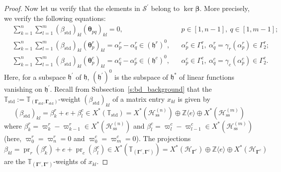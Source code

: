 \documentclass[11pt]{article}
\newcommand{\bbeta}{\boldsymbol{\beta}}
\newcommand{\btheta}{{\boldsymbol{\theta}}}
\newcommand{\bg}{\mathbf{\Gamma}}
\newcommand{\std}{\mathrm{std}}
\DeclareMathOperator{\pr}{pr}
\DeclareMathOperator{\ses}{ss}
\theoremstyle{definition}\newtheorem{definition}[theorem]{Definition}
\theoremstyle{definition}\newtheorem{remark}[theorem]{Remark}
\theoremstyle{remark}
\numberwithin{equation}{section}
\begin{document}
\begin{proof}
    Now let us verify that the elements in $\mathcal{S}^\prime$ belong to $\ker \bbeta$. More precisely, we verify the following equations:
    \begin{align*}
        & \sum_{k=1}^{n}\sum_{l=1}^m (\beta_{\std})_{kl}(\btheta_{pq})_{kl} = 0, & &p \in [1,n-1], \ q \in [1,m-1];\\
        & \sum_{k=1}^n \sum_{l=1}^m (\beta_{\std})_{kl}  (\btheta_p^r)_{kl} = \alpha^r_p - \alpha^r_q \in (\mathfrak{h}^r)^0, & &\alpha_p^r \in \Gamma_1^r,\ \alpha_q^r = \gamma_r(\alpha_p^r)\in \Gamma_2^r;\\
        &\sum_{k=1}^n \sum_{l=1}^m (\beta_{\std})_{kl}  (\btheta_p^c)_{kl} = \alpha^c_q - \alpha^c_p \in (\mathfrak{h}^c)^0, & &\alpha_p^c \in \Gamma_1^c,\ \alpha_q^c = \gamma_c(\alpha_p^c) \in \Gamma_2^c.
    \end{align*}
    Here, for a subspace $\mathfrak{h}^\prime$ of $\mathfrak{h}$, $(\mathfrak{h}^\prime)^0$ is the subspace of $\mathfrak{h}^*$ of linear functions vanishing on $\mathfrak{h}^\prime$. 
    Recall from Subsection~\ref{s:bd_background} that the $\mathbb{T}_{\std}:=\mathbb{T}_{(\bg_{\std},\bg_{\std})}$-weight $(\beta_{\std})_{kl}$ of a matrix entry $x_{kl}$ is given by
    \begin{equation*}
        (\beta_{\std})_{kl}= \beta_k^r + e + \beta_l^c \in X^*(\mathbb{T}_{\std}) =  X^*(\mathcal{H}_{\ses}^{(n)})\oplus \mathbb{Z}\langle e\rangle \oplus X^*(\mathcal{H}_{\ses}^{(m)})
    \end{equation*}
    where 
     $\beta_{k}^r = \varpi_k^r - \varpi_{k-1}^r \in X^*(\mathcal{H}_{\ses}^{(n)})$ and $\beta_{l}^c = \varpi_l^c - \varpi_{l-1}^c \in X^*(\mathcal{H}_{\ses}^{(m)})$ (here, $\varpi_{0}^r = \varpi_n^r = 0$ and $\varpi_0^c =\varpi_m^c = 0$). The projections
    \begin{equation*}
        \beta_{kl} = \pr_r(\beta_{k}^r) + e + \pr_c(\beta_{l}^c) \in X^*(\mathbb{T}_{(\bg^r,\bg^c)}) = X^*(\mathcal{H}_{\bg^r})\oplus \mathbb{Z}\langle e\rangle \oplus X^*(\mathcal{H}_{\bg^c})
    \end{equation*} 
    are the $\mathbb{T}_{(\bg^r,\bg^c)}$-weights of $x_{kl}$.
    

\end{proof}
\end{document}
